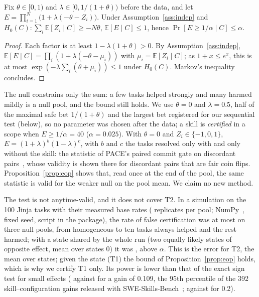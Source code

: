 \documentclass[sigconf,review,anonymous]{acmart}
\begin{document}
\begin{proposition}\label{prop:eop}
Fix $\theta\in[0,1)$ and $\lambda\in[0,1/(1+\theta))$ before the data, and let
$E=\prod_{i=1}^N\bigl(1+\lambda(-\theta-Z_i)\bigr)$. Under Assumption~\ref{ass:indep} and
$H_0(C):\sum_i\mathbb{E}[Z_i\mid C]\ge-N\theta$, $\mathbb{E}[E\mid C]\le1$, hence
$\Pr[E\ge1/\alpha\mid C]\le\alpha$.
\end{proposition}
\begin{proof}
Each factor is at least $1-\lambda(1+\theta)>0$. By Assumption~\ref{ass:indep},
$\mathbb{E}[E\mid C]=\prod_i(1+\lambda(-\theta-\mu_i))$ with $\mu_i=\mathbb{E}[Z_i\mid C]$; as
$1+x\le e^x$, this is at most $\exp(-\lambda\sum_i(\theta+\mu_i))\le1$ under $H_0(C)$. Markov's
inequality concludes.
\end{proof}
The null constrains only the sum: a few tasks helped strongly and many harmed mildly is a null pool,
and the bound still holds. We use $\theta=0$ and $\lambda=0.5$, half of the maximal safe bet $1/(1+\theta)$ and the largest bet
registered for our sequential test (below), so no parameter was chosen after the data; a skill is
\emph{certified} in a scope when $E\ge1/\alpha=40$ ($\alpha=0.025$). With $\theta=0$ and
$Z_i\in\{-1,0,1\}$, $E=(1+\lambda)^b(1-\lambda)^c$, with $b$ and $c$ the tasks resolved only with and
only without the skill: the statistic of PACE's paired commit gate on discordant
pairs~\cite{pace_paired_anytime_gate}, whose validity is shown there for discordant pairs that are
fair coin flips. Proposition~\ref{prop:eop} shows that, read once at the end of the pool, the same
statistic is valid for the weaker null on the pool mean. We claim no new method.

The test is not anytime-valid, and it does not cover T2. In a simulation on the 100 Jinja tasks with
their measured base rates (\neopValidReps{} replicates per pool;
NumPy~\nsimNumpy{}, fixed seed, script in the package), the rate of false certification was
at most \neopTypeMax{} on three null pools, from homogeneous to ten tasks always helped and the rest
harmed; with a state shared by the whole run (two equally likely states of opposite effect, mean over
states $0$) it was \neopShared{}, above $\alpha$. This is the error for T2, the mean over states;
given the state (T1) the bound of Proposition~\ref{prop:eop} holds, which is why we certify T1 only. Its power is lower than that of the exact sign test
for small effects (\neopPowSmall{} against \neopSignPowSmall{} for a gain of 0.109, the 95th percentile
of the 392 skill--configuration gains released with SWE-Skills-Bench~\cite{sskb_paper}; \neopPowMid{}
against \neopSignPowMid{} for 0.2).
\end{document}
